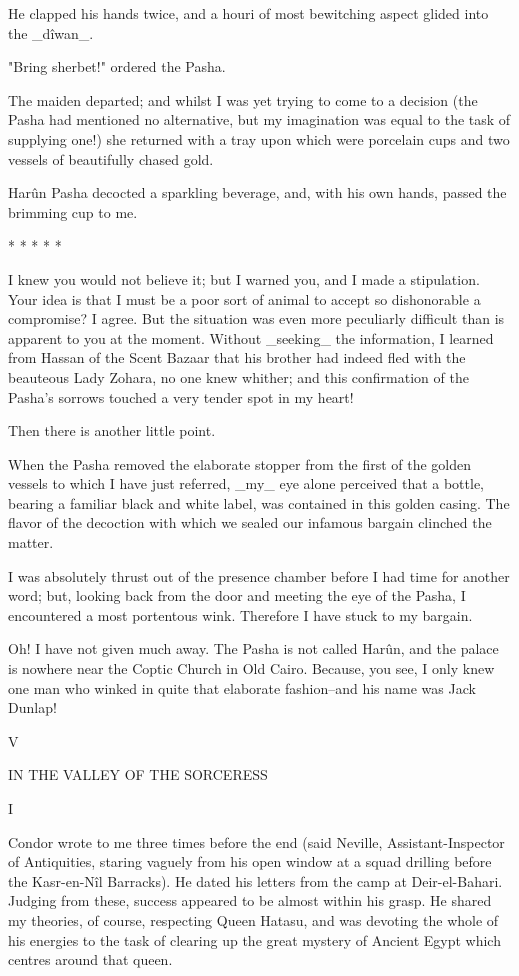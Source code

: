 He clapped his hands twice, and a houri of most bewitching aspect
glided into the _dîwan_.

"Bring sherbet!" ordered the Pasha.

The maiden departed; and whilst I was yet trying to come to a
decision (the Pasha had mentioned no alternative, but my imagination
was equal to the task of supplying one!) she returned with a tray upon
which were porcelain cups and two vessels of beautifully chased gold.

Harûn Pasha decocted a sparkling beverage, and, with his own hands,
passed the brimming cup to me.

       *       *       *       *       *

I knew you would not believe it; but I warned you, and I made a
stipulation. Your idea is that I must be a poor sort of animal to
accept so dishonorable a compromise? I agree. But the situation was
even more peculiarly difficult than is apparent to you at the moment.
Without _seeking_ the information, I learned from Hassan of the Scent
Bazaar that his brother had indeed fled with the beauteous Lady
Zohara, no one knew whither; and this confirmation of the Pasha's
sorrows touched a very tender spot in my heart!

Then there is another little point.

When the Pasha removed the elaborate stopper from the first of the
golden vessels to which I have just referred, _my_ eye alone perceived
that a bottle, bearing a familiar black and white label, was contained
in this golden casing. The flavor of the decoction with which we
sealed our infamous bargain clinched the matter.

I was absolutely thrust out of the presence chamber before I had time
for another word; but, looking back from the door and meeting the eye
of the Pasha, I encountered a most portentous wink. Therefore I have
stuck to my bargain.

Oh! I have not given much away. The Pasha is not called Harûn, and the
palace is nowhere near the Coptic Church in Old Cairo. Because, you
see, I only knew one man who winked in quite that elaborate
fashion--and his name was Jack Dunlap!




V

IN THE VALLEY OF THE SORCERESS


I

Condor wrote to me three times before the end (said Neville,
Assistant-Inspector of Antiquities, staring vaguely from his open
window at a squad drilling before the Kasr-en-Nîl Barracks). He dated
his letters from the camp at Deir-el-Bahari. Judging from these,
success appeared to be almost within his grasp. He shared my theories,
of course, respecting Queen Hatasu, and was devoting the whole of his
energies to the task of clearing up the great mystery of Ancient Egypt
which centres around that queen.

